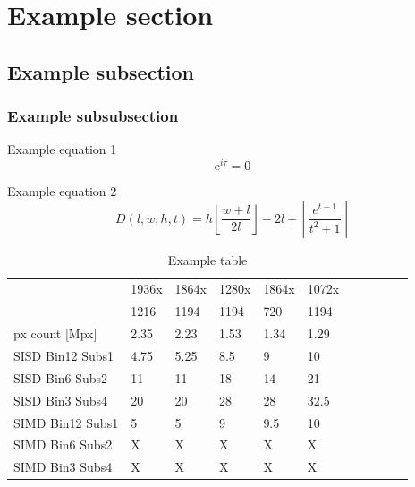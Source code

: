 \documentclass[11pt]{article}
\begin{document}
\section{Example section}
\subsection{Example subsection}
\subsubsection{Example subsubsection}

Example equation 1
\begin{equation}
    \mathrm{e}^{i\tau} = 0
\end{equation}

Example equation 2
\begin{equation}
    D(l,w,h,t) = h \left\lfloor \frac{w+l}{2l} \right\rfloor - 2l + \left\lceil \frac{e^{t-1}}{t^2+1} \right\rceil
\end{equation}

\begin{table}[ht]
    \centering
    \begin{tabular}{|l|l|l|l|l|l|l|l|l|l|l|}
        \hline
         & \textsf{1936x} & \textsf{1864x} & \textsf{1280x} & \textsf{1864x} & \textsf{1072x} \\
         & \textsf{1216}  & \textsf{1194}  & \textsf{1194}  & \textsf{720}   & \textsf{1194}  \\
        \hline
        px count [Mpx] & 2.35 & 2.23 & 1.53 & 1.34 & 1.29 \\
        \hline
        \hline
        \hline
        SISD Bin12 Subs1 & 4.75  & 5.25  & 8.5   & 9     & 10    \\ \hline
        SISD Bin6 Subs2  & 11    & 11    & 18    & 14    & 21    \\ \hline
        SISD Bin3 Subs4  & 20    & 20    & 28    & 28    & 32.5  \\
        \hline                                                                 
        \hline                                                                 
        SIMD Bin12 Subs1 & 5     & 5     & 9     & 9.5   & 10    \\ \hline
        SIMD Bin6 Subs2  & X     & X     & X     & X     & X     \\ \hline
        SIMD Bin3 Subs4  & X     & X     & X     & X     & X     \\ \hline
    \end{tabular}
    \caption{Example table}
\end{table}
\end{document}
